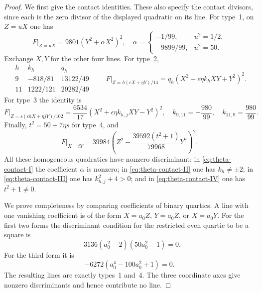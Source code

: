\begin{proof}
We first give the contact identities.  These also specify the contact
divisors, since each is the zero divisor of the displayed quadratic on its
line.  For type~1, on $Z=uX$ one has
\begin{equation}
 F|_{Z=uX}=9801(Y^2+\alpha X^2)^2,
 \quad
 \alpha=\begin{cases}
 -1/99,&u^2=1/2,\\
 -9899/99,&u^2=50.
 \end{cases}
 \label{eq:theta-contact-I}
\end{equation}
Exchange $X,Y$ for the other four lines.  For type~2,
\begin{equation}
 \begin{array}{c|c|c}
 h&k_h&q_h\\\hline
 9&-818/81&13122/49\\
 11&1222/121&29282/49
 \end{array}
 \qquad
 F|_{Z=h(\epsilon X+\eta Y)/14}
   =q_h(X^2+\epsilon\eta k_hXY+Y^2)^2.
 \label{eq:theta-contact-II}
\end{equation}
For type~3 the identity is
\begin{equation}
 F|_{Z=s(\epsilon hX+\eta jY)/102}
   =\frac{6534}{17}(X^2+\epsilon\eta k_{h,j}XY-Y^2)^2,
 \quad
 k_{9,11}=-\frac{980}{99},\quad k_{11,9}=\frac{980}{99}.
 \label{eq:theta-contact-III}
\end{equation}
Finally, $t^2=50+7\eta s$ for type~4, and
\begin{equation}
 F|_{X=tY}
  =39984\left(Z^2-\frac{39592(t^2+1)}{79968}Y^2\right)^2.
 \label{eq:theta-contact-IV}
\end{equation}
All these homogeneous quadratics have nonzero discriminant: in
\eqref{eq:theta-contact-I} the coefficient $\alpha$ is nonzero; in
\eqref{eq:theta-contact-II} one has $k_h\ne\pm2$; in
\eqref{eq:theta-contact-III} one has $k_{h,j}^2+4>0$; and in
\eqref{eq:theta-contact-IV} one has $t^2+1\ne0$.

We prove completeness by comparing coefficients of binary quartics.
A line with one vanishing coefficient is of the form $X=a_0Z$,
$Y=a_0Z$, or $X=a_0Y$.  For the first two forms the discriminant condition
for the restricted even quartic to be a square is
\[
 -3136(a_0^2-2)(50a_0^2-1)=0.
\]
For the third form it is
\[
 -6272(a_0^4-100a_0^2+1)=0.
\]
The resulting lines are exactly types~1 and~4.  The three coordinate axes
give nonzero discriminants and hence contribute no line.


\end{proof}
